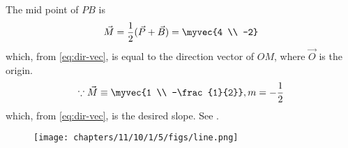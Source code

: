 The mid point of $PB$ is
\begin{align}
\vec{M} =\frac{1}{2}(\vec{P}+\vec{B})
	= \myvec{4 \\ -2}  
\end{align}
which, from  \eqref{eq:dir-vec}, is equal to the direction vector of $OM$, where $\vec{O}$ is the origin.
\begin{align}
\because \vec{M} \equiv
	 \myvec{1 \\ -\frac{1}{2}},
	m = -\frac{1}{2}
\end{align}
which, from \eqref{eq:dir-vec},  is the desired slope.
See 
		.
	\begin{figure}[H]
		\centering
 \texttt{[image: chapters/11/10/1/5/figs/line.png]}
		\caption{}
		\label{fig:11/10/1/5}
  	\end{figure}
